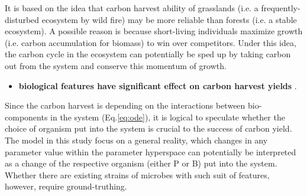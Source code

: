 \documentclass[../thesis.tex]{subfiles} %
\begin{document}
It is based on the idea that carbon harvest ability of grasslands (i.e. a frequently-disturbed ecosystem by wild fire) may be more reliable than forests (i.e. a stable ecosystem).\autocite{dass2018grasslands}  A possible reason is because short-living individuals maximize growth (i.e. carbon accumulation for biomass) to win over competitors.  Under this idea, the carbon cycle in the ecosystem can potentially be sped up by taking carbon out from the system and conserve this momentum of growth.

\begin{itemize}
    \item \textbf{
    biological features have significant effect on carbon harvest yields
    }.
\end{itemize}

Since the carbon harvest is depending on the interactions between bio-components in the system (Eq.\ref{eq:ode}), it is logical to speculate whether the choice of organism put into the system is crucial to the success of carbon yield.  The model in this study focus on a general reality, which changes in any parameter value within the parameter hyperspace can potentially be interpreted as a change of the respective organism (either P or B) put into the system.  Whether there are existing strains of microbes with such suit of features, however, require ground-truthing.
\end{document}
